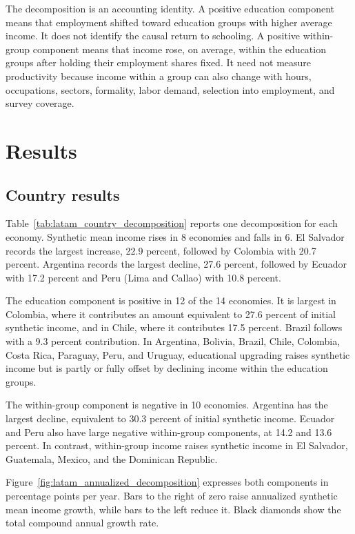 \documentclass[11pt]{article}
\begin{document}
The decomposition is an accounting identity. A positive education component
means that employment shifted toward education groups with higher average
income. It does not identify the causal return to schooling. A positive
within-group component means that income rose, on average, within the
education groups after holding their employment shares fixed. It need not
measure productivity because income within a group can also change with
hours, occupations, sectors, formality, labor demand, selection into
employment, and survey coverage.

\section{Results}

\subsection{Country results}

Table~\ref{tab:latam_country_decomposition} reports one decomposition for each
economy. Synthetic mean income rises in 8 economies and falls in 6. El
Salvador records the largest increase, 22.9 percent, followed by Colombia with
20.7 percent. Argentina records the largest decline, 27.6 percent, followed by
Ecuador with 17.2 percent and Peru (Lima and Callao) with 10.8 percent.



The education component is positive in 12 of the 14 economies. It is largest
in Colombia, where it contributes an amount equivalent to 27.6 percent of
initial synthetic income, and in Chile, where it contributes 17.5 percent.
Brazil follows with a 9.3 percent contribution. In Argentina, Bolivia, Brazil,
Chile, Colombia, Costa Rica, Paraguay, Peru, and Uruguay, educational
upgrading raises synthetic income but is partly or fully offset by declining
income within the education groups.

The within-group component is negative in 10 economies. Argentina has the
largest decline, equivalent to 30.3 percent of initial synthetic income.
Ecuador and Peru also have large negative within-group components, at 14.2
and 13.6 percent. In contrast, within-group income raises synthetic income in
El Salvador, Guatemala, Mexico, and the Dominican Republic.

Figure~\ref{fig:latam_annualized_decomposition} expresses both components in
percentage points per year. Bars to the right of zero raise annualized
synthetic mean income growth, while bars to the left reduce it. Black diamonds
show the total compound annual growth rate.
\end{document}
